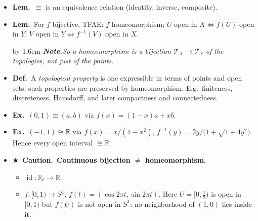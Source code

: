 \documentclass[12pt,a4paper]{article}
\newcommand{\Dfn}{\textbf{Def.}~}
\newcommand{\Lem}{\textbf{Lem.}~}
\newcommand{\Exa}{\textbf{Ex.}~}
\newcommand{\Warn}{\textbf{Caution.}~}
\newcommand{\Key}{$\bigstar$~}                  %
\newcommand{\Cue}[1]{%
  \par\addvspace{7pt}\nopagebreak
  \begingroup
    \advance\leftskip by 1.6em
    \parindent=0pt \small\color{cue}%
    \textbf{\textit{Note.}}\enspace \textit{#1}\par
  \endgroup
  \addvspace{9pt}}
\newenvironment{BL}%
  {\begin{itemize}[leftmargin=1.4em,labelsep=0.55em,itemsep=11pt,topsep=11pt,parsep=0pt]}%
  {\end{itemize}}
\newenvironment{SB}%
  {\begin{itemize}[label=--,leftmargin=1.3em,labelsep=0.45em,itemsep=6pt,topsep=7pt,parsep=0pt]}%
  {\end{itemize}}
\newcommand{\RR}{\mathbb{R}}
\newcommand{\cT}{\mathcal{T}}
\DeclareMathOperator{\id}{id}
\renewcommand{\iff}{\Leftrightarrow}
\begin{document}
\begin{BL}
      $f^{-1}$ are continuous. Then $X\cong Y$, \emph{topologically equivalent}.
\item \Lem $\cong$ is an equivalence relation (identity, inverse, composite).
\item \Lem For $f$ bijective, TFAE: $f$ homeomorphism;
      $U$ open in $X\iff f(U)$ open in $Y$;
      $V$ open in $Y\iff f^{-1}(V)$ open in $X$.
\Cue{So a homeomorphism is a bijection $\cT_X\to\cT_Y$ of the topologies, not just of the points.}
\item \Dfn A \emph{topological property} is one expressible in terms of points and open sets;
      such properties are preserved by homeomorphism.
      E.g.\ finiteness, discreteness, Hausdorff, and later compactness and connectedness.
\item \Exa $(0,1)\cong(a,b)$ via $f(x)=(1-x)a+xb$.
\item \Exa $(-1,1)\cong\RR$ via $f(x)=x/(1-x^2)$, \;
      $f^{-1}(y)=2y/\bigl(1+\sqrt{1+4y^2}\bigr)$. Hence every open interval $\cong\RR$.
\item \Key\Warn \textbf{Continuous bijection $\neq$ homeomorphism.}
  \begin{SB}
  \item $\id\colon\RR_\ell\to\RR$.
  \item $f\colon[0,1)\to S^1$, $f(t)=(\cos2\pi t,\sin2\pi t)$. Here $U=[0,\tfrac12)$ is open in
        $[0,1)$ but $f(U)$ is not open in $S^1$: no neighborhood of $(1,0)$ lies inside it.
  \end{SB}
\end{BL}
\end{document}
